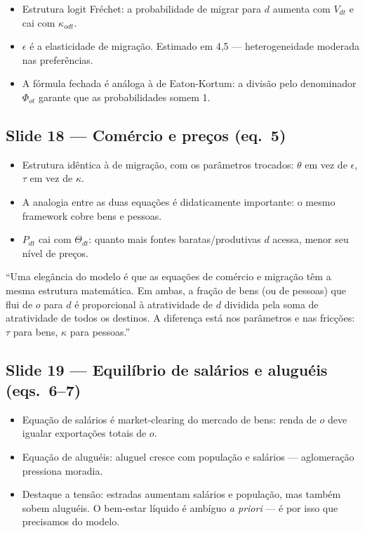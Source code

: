 \documentclass[12pt, a4paper]{article}
\begin{document}
\begin{itemize}
    \item Estrutura logit Fréchet: a probabilidade de migrar para $d$ aumenta com $V_{dt}$ e cai com $\kappa_{odt}$.
    \item $\epsilon$ é a elasticidade de migração. Estimado em 4,5 --- heterogeneidade moderada nas preferências.
    \item A fórmula fechada é análoga à de Eaton-Kortum: a divisão pelo denominador $\Phi_{ot}$ garante que as probabilidades somem 1.
\end{itemize}

\subsection*{Slide 18 --- Comércio e preços (eq.\ 5)}

\begin{itemize}
    \item Estrutura idêntica à de migração, com os parâmetros trocados: $\theta$ em vez de $\epsilon$, $\tau$ em vez de $\kappa$.
    \item A analogia entre as duas equações é didaticamente importante: o mesmo framework cobre bens e pessoas.
    \item $P_{dt}$ cai com $\Theta_{dt}$: quanto mais fontes baratas/produtivas $d$ acessa, menor seu nível de preços.
\end{itemize}

\begin{mdframed}[style=sintese]
``Uma elegância do modelo é que as equações de comércio e migração têm a mesma estrutura matemática.
Em ambas, a fração de bens (ou de pessoas) que flui de $o$ para $d$ é proporcional à atratividade
de $d$ dividida pela soma de atratividade de todos os destinos. A diferença está nos parâmetros e
nas fricções: $\tau$ para bens, $\kappa$ para pessoas.''
\end{mdframed}

\subsection*{Slide 19 --- Equilíbrio de salários e aluguéis (eqs.\ 6--7)}

\begin{itemize}
    \item Equação de salários é market-clearing do mercado de bens: renda de $o$ deve igualar exportações totais de $o$.
    \item Equação de aluguéis: aluguel cresce com população e salários --- aglomeração pressiona moradia.
    \item Destaque a tensão: estradas aumentam salários e população, mas também sobem aluguéis. O bem-estar líquido é ambíguo \textit{a priori} --- é por isso que precisamos do modelo.
\end{itemize}
\end{document}
